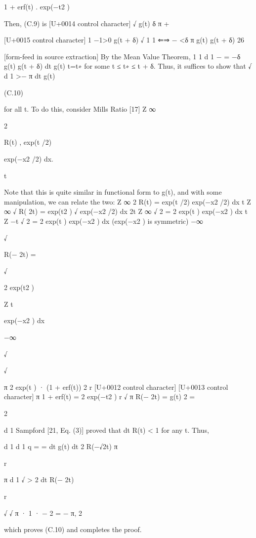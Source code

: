 \documentclass[10pt]{article}
\begin{document}
\begin{ReviewVerbatim}
1 + erf(t)
.
exp(−t2 )

Then, (C.9) is
[U+0014 control character]
√
g(t) δ π +

[U+0015 control character]
1
−1>0
g(t + δ)
√
1
1
⇐⇒
−
<δ π
g(t) g(t + δ)
26


[form-feed in source extraction]
By the Mean Value Theorem,
1
1
d 1
−
= −δ
g(t) g(t + δ)
dt g(t) t=t∗
for some t ≤ t∗ ≤ t + δ. Thus, it suffices to show that
√
d 1
>− π
dt g(t)

(C.10)

for all t. To do this, consider Mills Ratio [17]
Z ∞

2

R(t) , exp(t /2)

exp(−x2 /2) dx.

t

Note that this is quite similar in functional form to g(t), and with some manipulation, we can relate the two:
Z ∞
2
R(t) = exp(t /2)
exp(−x2 /2) dx
t
Z ∞
√
R( 2t) = exp(t2 ) √ exp(−x2 /2) dx
2t
Z ∞
√
2
= 2 exp(t )
exp(−x2 ) dx
t
Z −t
√
2
= 2 exp(t )
exp(−x2 ) dx
(exp(−x2 ) is symmetric)
−∞

√

R(− 2t) =

√

2 exp(t2 )

Z t

exp(−x2 ) dx

−∞

√

√

π
2 exp(t ) ·
(1 + erf(t))
2
r [U+0012 control character]
[U+0013 control character]
π 1 + erf(t)
=
2 exp(−t2 )
r
√
π
R(− 2t) =
g(t)
2
=

2

d 1
Sampford [21, Eq. (3)] proved that dt
R(t) < 1 for any t. Thus,

d 1
d
1
q
=
=
dt g(t)
dt 2 R(−√2t)
π

r

π d
1
√
>
2 dt R(− 2t)

r

√
√
π
· 1 · − 2 = − π,
2

which proves (C.10) and completes the proof.
\end{ReviewVerbatim}
\end{document}
